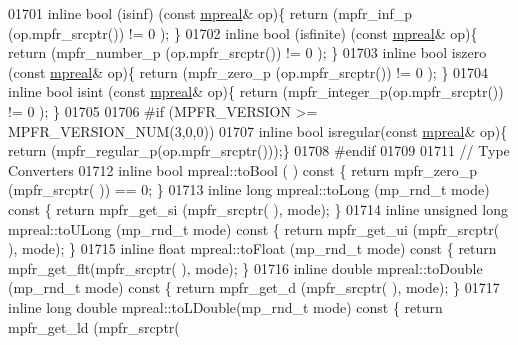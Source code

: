 \begin{DoxyCode}
01701 \textcolor{keyword}{inline} bool (isinf)    (\textcolor{keyword}{const} \hyperlink{classmpfr_1_1mpreal}{mpreal}& op)\{    \textcolor{keywordflow}{return} (mpfr\_inf\_p    (op.mpfr\_srcptr()) != 0 );    \}
01702 \textcolor{keyword}{inline} bool (isfinite) (\textcolor{keyword}{const} \hyperlink{classmpfr_1_1mpreal}{mpreal}& op)\{    \textcolor{keywordflow}{return} (mpfr\_number\_p (op.mpfr\_srcptr()) != 0 );    \}
01703 \textcolor{keyword}{inline} \textcolor{keywordtype}{bool} iszero   (\textcolor{keyword}{const} \hyperlink{classmpfr_1_1mpreal}{mpreal}& op)\{    \textcolor{keywordflow}{return} (mpfr\_zero\_p   (op.mpfr\_srcptr()) != 0 );    \}
01704 \textcolor{keyword}{inline} \textcolor{keywordtype}{bool} isint    (\textcolor{keyword}{const} \hyperlink{classmpfr_1_1mpreal}{mpreal}& op)\{    \textcolor{keywordflow}{return} (mpfr\_integer\_p(op.mpfr\_srcptr()) != 0 );    \}
01705 
01706 \textcolor{preprocessor}{#if (MPFR\_VERSION >= MPFR\_VERSION\_NUM(3,0,0))}
01707 \textcolor{keyword}{inline} \textcolor{keywordtype}{bool} isregular(\textcolor{keyword}{const} \hyperlink{classmpfr_1_1mpreal}{mpreal}& op)\{    \textcolor{keywordflow}{return} (mpfr\_regular\_p(op.mpfr\_srcptr()));\}
01708 \textcolor{preprocessor}{#endif}
01709 
01711 \textcolor{comment}{// Type Converters}
01712 \textcolor{keyword}{inline} \textcolor{keywordtype}{bool}               mpreal::toBool   (             )\textcolor{keyword}{  const    }\{    \textcolor{keywordflow}{return}  mpfr\_zero\_p (mpfr\_srcptr(
      )) == 0;     \}
01713 \textcolor{keyword}{inline} \textcolor{keywordtype}{long}               mpreal::toLong   (mp\_rnd\_t mode)\textcolor{keyword}{  const    }\{    \textcolor{keywordflow}{return}  mpfr\_get\_si (mpfr\_srcptr(
      ), mode);    \}
01714 \textcolor{keyword}{inline} \textcolor{keywordtype}{unsigned} \textcolor{keywordtype}{long}      mpreal::toULong  (mp\_rnd\_t mode)\textcolor{keyword}{  const    }\{    \textcolor{keywordflow}{return}  mpfr\_get\_ui (mpfr\_srcptr(
      ), mode);    \}
01715 \textcolor{keyword}{inline} \textcolor{keywordtype}{float}              mpreal::toFloat  (mp\_rnd\_t mode)\textcolor{keyword}{  const    }\{    \textcolor{keywordflow}{return}  mpfr\_get\_flt(mpfr\_srcptr(
      ), mode);    \}
01716 \textcolor{keyword}{inline} \textcolor{keywordtype}{double}             mpreal::toDouble (mp\_rnd\_t mode)\textcolor{keyword}{  const    }\{    \textcolor{keywordflow}{return}  mpfr\_get\_d  (mpfr\_srcptr(
      ), mode);    \}
01717 \textcolor{keyword}{inline} \textcolor{keywordtype}{long} \textcolor{keywordtype}{double}        mpreal::toLDouble(mp\_rnd\_t mode)\textcolor{keyword}{  const    }\{    \textcolor{keywordflow}{return}  mpfr\_get\_ld (mpfr\_srcptr(

\end{DoxyCode}
